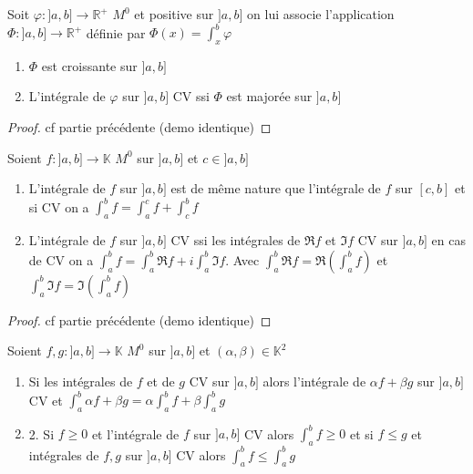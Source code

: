 \documentclass[11pt,hidelinks]{book}
\theoremstyle{mytheoremstyle}
\theoremstyle{mytheoremstyle}
\theoremstyle{mytheoremstyle}
\theoremstyle{mytheoremstyle}
\theoremstyle{mytheoremstyle}
\theoremstyle{mytheoremstyle}
\theoremstyle{mytheoremstyle}
\theoremstyle{mytheoremstyle}
\theoremstyle{myproblemstyle}
\def\mbb#1{\mathbb{#1}}
\def\bR{\mbb{R}}
\def\ib#1{\int_{a}^{b} #1}
\def\bK{\mbb{K}}
\def\abc{]a,b]}
\newcommand{\func}[3]{#1\colon#2\to#3}
\newcommand{\parenth}[1]{\left(#1\right)}
\begin{document}
    \begin{adjustwidth}{-2em}{-1em}
        \begin{theorem}
            Soit $\func{\varphi}{\abc}{\bR^+}$ $M^0$ et positive sur $\abc$
            on lui associe l'application $\func{\Phi}{\abc}{\bR^+}$ définie par 
            $\Phi(x) = \int_{x}^{b} \varphi$ 
            \begin{enumerate} 
            \item $\Phi$ est croissante sur $\abc$ 
            \item L'intégrale de $\varphi$ sur $\abc$ CV ssi $\Phi$ est majorée sur $\abc$
            \end{enumerate}
            \begin{proof}
                cf partie précédente (demo identique)
            \end{proof} 
        \end{theorem}
        \begin{prop}
            Soient $\func{f}{\abc}{\bK}$ $M^0$ sur $\abc$ et $c \in \abc$ 
            \begin{enumerate}
            \item L'intégrale de $f$ sur $\abc$ est de même nature que l'intégrale 
            de $f$ sur $[c,b]$ et si CV on a $\ib{f} = \int_{a}^{c} f + \int_{c}^{b} f$ 
            \item L'intégrale de $f$ sur $\abc$ CV ssi les intégrales de $\Re f$ et $\Im f$ CV sur $\abc$ 
            en cas de CV on a $\ib{f} = \ib{\Re f} + i \ib{\Im f}$. Avec $\ib{\Re f} = \Re \parenth{\ib{f}}$ et $\ib{\Im f} = \Im \parenth{\ib{f}}$
            \end{enumerate}
            \begin{proof}
                cf partie précédente (demo identique)
            \end{proof}
        \end{prop}
        \begin{prop}
            Soient $\func{f,g}{\abc}{\bK}$ $M^0$ sur $\abc$ et $(\alpha, \beta) \in \bK^2$ 
            \begin{enumerate} 
            \item Si les intégrales de $f$ et de $g$ CV sur $\abc$ alors l'intégrale de $\alpha f + \beta g$ sur $\abc$
            CV et $\ib{\alpha f + \beta g} = \alpha \ib{f} + \beta \ib{g}$
            \item 2. Si $f \geq 0$ et l'intégrale de $f$ sur $\abc$ CV alors $\ib{f} \geq 0$
            et si $f \leq g$ et intégrales de $f,g$ sur $\abc$ CV alors $\ib{f} \leq \ib{g}$

\end{enumerate}
\end{prop}
\end{adjustwidth}
\end{document}
